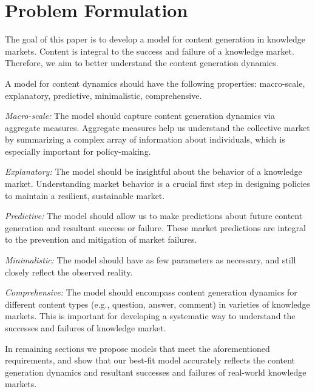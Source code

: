 \section{Problem Formulation} 
The goal of this paper is to develop a model for content generation in knowledge markets. Content is integral to the success and failure of a knowledge market. Therefore, we aim to better understand the content generation dynamics.

A model for content dynamics should have the following properties: macro-scale, explanatory, predictive, minimalistic, comprehensive.



\emph{Macro-scale:} The model should capture content generation dynamics via aggregate measures. Aggregate measures help us understand the collective market by summarizing a complex array of information about individuals, which is especially important for policy-making.

\emph{Explanatory:} The model should be insightful about the behavior of a knowledge market. Understanding market behavior is a crucial first step in designing policies to maintain a resilient, sustainable market.

\emph{Predictive:} The model should allow us to make predictions about future content generation and resultant success or failure. These market predictions are integral to the prevention and mitigation of market failures.

\emph{Minimalistic:} The model should have as few parameters as necessary, and still closely reflect the observed reality. %

\emph{Comprehensive:} The model should encompass content generation dynamics for different content types (e.g., question, answer, comment) in varieties of knowledge markets. This is important for developing a systematic way to understand the successes and failures of knowledge market.

In remaining sections we propose models that meet the aforementioned requirements, and show that our best-fit model accurately reflects the content generation dynamics and resultant successes and failures of real-world knowledge markets.
